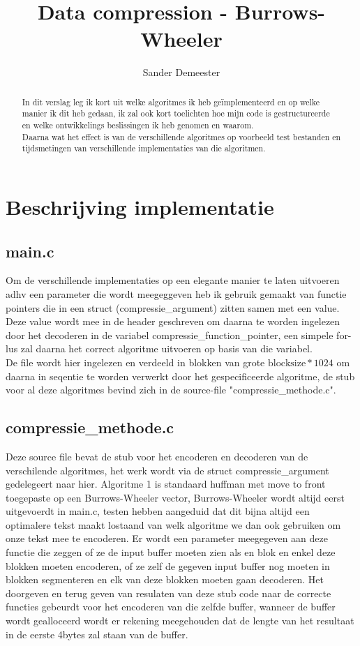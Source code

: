 \documentclass[10pt,a4paper]{report}
\author{Sander Demeester}
\title{Data compression - Burrows-Wheeler}
\begin{document}
\maketitle
\begin{abstract}
In dit verslag leg ik kort uit welke algoritmes ik heb ge\"implementeerd en op welke manier ik dit heb gedaan, ik zal ook kort toelichten hoe mijn code is gestructureerde en welke ontwikkelings beslissingen ik heb genomen en waarom.\\

Daarna wat het effect is van de verschillende algoritmes op voorbeeld test bestanden en tijdsmetingen van verschillende implementaties van die algoritmen. 
\end{abstract}
\section*{Beschrijving implementatie}
\subsection*{main.c}
Om de verschillende implementaties op een elegante manier te laten uitvoeren adhv een parameter die wordt meegeggeven heb ik gebruik gemaakt van functie pointers die in een struct (compressie\_argument) zitten samen met een value. Deze value wordt mee in de header geschreven om daarna te worden ingelezen door het decoderen in de variabel compressie\_function\_pointer, een simpele for-lus zal daarna het correct algoritme uitvoeren op basis van die variabel.\\

De file wordt hier ingelezen en verdeeld in blokken van grote $\text{blocksize}*1024$ om daarna in seqentie te worden verwerkt door het gespecificeerde algoritme, de stub voor al deze algoritmes bevind zich in de source-file "compressie\_methode.c".
\subsection*{compressie\_methode.c}
Deze source file bevat de stub voor het encoderen en decoderen van de verschilende algoritmes, het werk wordt via de struct compressie\_argument gedelegeert naar hier. Algoritme 1 is standaard huffman met move to front toegepaste op een Burrows-Wheeler vector, Burrows-Wheeler wordt altijd eerst uitgevoerdt in main.c, testen hebben aangeduid dat dit bijna altijd een optimalere tekst maakt lostaand van welk algoritme we dan ook gebruiken om onze tekst mee te encoderen. Er wordt een parameter meegegeven aan deze functie die zeggen of ze de input buffer moeten zien als en blok en enkel deze blokken moeten encoderen, of ze zelf de gegeven input buffer nog moeten in blokken segmenteren en elk van deze blokken moeten gaan decoderen. Het doorgeven en terug geven van resulaten van deze stub code naar de correcte functies gebeurdt voor het encoderen van die zelfde buffer, wanneer de buffer wordt gealloceerd wordt er rekening meegehouden dat de lengte van het resultaat in de eerste 4bytes zal staan van de buffer. \\
\end{document}
